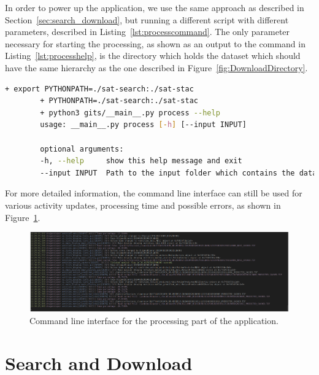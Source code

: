 \documentclass[12pt, a4paper]{report}
\begin{document}
	\begin{lstlisting}[caption={Help command for processing.},label={lst:processcommand},language=Bash]
		% bash -x run_process.sh --help
	\end{lstlisting}
	
	In order to power up the application, we use the same approach as described in Section~\ref{sec:search_download}, but running a different script with different parameters, described in Listing~\ref{lst:processcommand}. The only parameter necessary for starting the processing, as shown as an output to the command in Listing~\ref{lst:processhelp}, is the directory which holds the dataset which should have the same hierarchy as the one described in Figure~\ref{fig:DownloadDirectory}.
	
	\begin{lstlisting}[caption={Detailed parameters required for the download script.},label={lst:processhelp},language=Bash]
		+ export PYTHONPATH=./sat-search:./sat-stac
		+ PYTHONPATH=./sat-search:./sat-stac
		+ python3 gits/__main__.py process --help
		usage: __main__.py process [-h] [--input INPUT]
		
		optional arguments:
		-h, --help     show this help message and exit
		--input INPUT  Path to the input folder which contains the dataset of glaciers.
	\end{lstlisting}
	
	For more detailed information, the command line interface can still be used for various activity updates, processing time and possible errors, as shown in Figure~\ref{fig:process_cmd}.
	
	\begin{figure}[h!]
		\centering
		\includegraphics[width=\columnwidth]{../images/process_cmd.png}
		\caption{Command line interface for the processing part of the application.}
		\label{fig:process_cmd}
	\end{figure}
	
		
	\section{Search and Download}
	\label{seq:sd_implementation}
		
\end{document}
